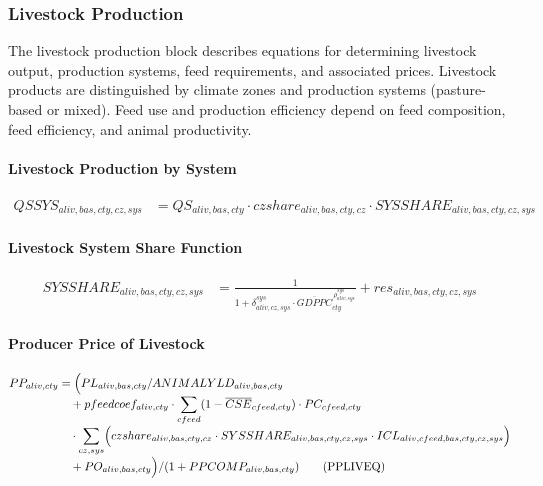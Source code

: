 \subsubsection{Livestock Production}

The livestock production block describes equations for determining livestock output, production systems, feed requirements, and associated prices.  
Livestock products are distinguished by climate zones and production systems (pasture-based or mixed).  
Feed use and production efficiency depend on feed composition, feed efficiency, and animal productivity.

\paragraph{Livestock Production by System}
\begin{align}
  QSSYS_{aliv,bas,cty,cz,sys}
  &= QS_{aliv,bas,cty}
     \cdot czshare_{aliv,bas,cty,cz}
     \cdot SYSSHARE_{aliv,bas,cty,cz,sys}
  \tag{LIVSYSEQ}\label{eq:LIVSYSEQ}
\end{align}

\paragraph{Livestock System Share Function}
\begin{align}
  SYSSHARE_{aliv,bas,cty,cz,sys}
  &= \frac{1}{
       1 + \delta^{sys}_{aliv,cz,sys}
       \cdot
       \overline{GDPPC}_{cty}^{\,\rho^{sys}_{aliv,sys}}
     }
     + res_{aliv,bas,cty,cz,sys}
  \tag{SYSSHAREEQ}\label{eq:SYSSHAREEQ}
\end{align}

\paragraph{Producer Price of Livestock}
\begin{align}
  PP_{aliv,cty}
  &= \Bigl(
       PL_{aliv,bas,cty}
       / ANIMALYLD_{aliv,bas,cty}
       \nonumber\\[-0.3em]
  &\quad
       + pfeedcoef_{aliv,cty}
         \cdot
         \sum_{cfeed}
         (1 - \overline{CSE}_{cfeed,cty})
         \cdot
         PC_{cfeed,cty}
         \nonumber\\[-0.3em]
  &\quad
         \cdot
         \sum_{cz,sys}
         \Bigl(
           czshare_{aliv,bas,cty,cz}
           \cdot
           SYSSHARE_{aliv,bas,cty,cz,sys}
           \cdot
           ICL_{aliv,cfeed,bas,cty,cz,sys}
         \Bigr)
         \nonumber\\[-0.3em]
  &\quad
       + PO_{aliv,bas,cty}
     \Bigr)
     / (1 + PPCOMP_{aliv,bas,cty})
  \tag{PPLIVEQ}\label{eq:PPLIVEQ}
\end{align}

